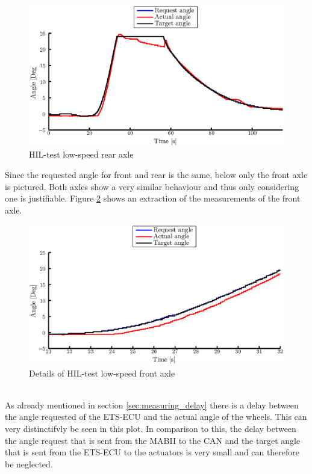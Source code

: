 \documentclass[ExampleMasters.tex]{subfiles}
\begin{document}
\begin{figure}[!htb]
	\centering
	\includegraphics[width=1\linewidth]{figures/HIL002_rear}
	\caption{HIL-test low-speed rear axle}
	
	\label{fig:HIL002_rear}
\end{figure}
Since the requested angle for front and rear is the same, below only the front axle is pictured. Both axles show a very similar behaviour and thus only considering one is justifiable.
Figure \ref{fig:HIL002_front_closeup} shows an extraction of the measurements of the front axle. 
\begin{figure}[!htb]
	\centering
	\includegraphics[width=1\linewidth]{figures/HIL002_front_closeup}
	\caption{Details of HIL-test low-speed front axle}
	
	\label{fig:HIL002_front_closeup}
\end{figure} \\
As already mentioned in section \ref{sec:measuring_delay} there is a delay between the angle requested of the \gls{ETS}-\gls{ECU} and the actual angle of the wheels. This can very distinctifvly be seen in this plot. In comparison to this, the delay between the angle request that is sent from the \gls{MABII} to the \gls{CAN} and the target angle that is sent from the \gls{ETS}-\gls{ECU} to the actuators is very small and can therefore be neglected.\\
\end{document}
